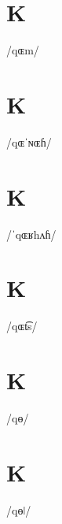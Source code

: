 \documentclass[10pt,a4paper,twoside]{book}
\begin{document}
\section*{K}

\begin{multicols}{3}
 {/qɶm/} {}
\end{multicols}

\section*{K}

\begin{multicols}{3}
 {/qɶˈɴɶɦ/} {}
\end{multicols}

\section*{K}

\begin{multicols}{3}
 {/ˈqɶʁhʌɦ/} {}
\end{multicols}

\section*{K}

\begin{multicols}{3}
 {/qɶt͡s/} {}
\end{multicols}

\section*{K}

\begin{multicols}{3}
 {/qɵ/} {}
\end{multicols}

\section*{K}

\begin{multicols}{3}
 {/qɵǀ/} {}
\end{multicols}
\end{document}
